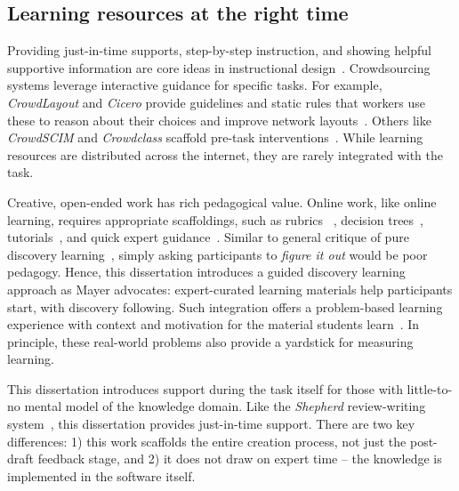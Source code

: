  

\subsection{Learning resources at the right time}
Providing just-in-time supports, step-by-step instruction, and showing helpful supportive
 information are core ideas in instructional design~\cite{Kirschner2008}. Crowdsourcing 
systems leverage interactive guidance for specific tasks. For example, \textit{CrowdLayout} and 
\textit{Cicero} provide guidelines and static rules that workers use these to reason about their choices
 and improve network layouts~\cite{chen2019cicero, Singh:2018:CCD:3173574.3173806}. 
Others like \textit{CrowdSCIM} and \textit{Crowdclass} scaffold pre-task interventions~\cite{Lee2016,wang2018exploring}. 
While learning resources are distributed across the internet, they are rarely integrated with the task. 

Creative, open-ended work has rich pedagogical value. Online work, like 
online learning, requires appropriate scaffoldings, such as rubrics
~\cite{Boud1995, Kulkarni2013peer}, decision trees~\cite{Lee2016,Yu2006}, 
tutorials~\cite{Andersen2012}, and quick expert guidance~\cite{dow2012shepherding}. 
Similar to general critique of pure discovery learning~\cite{Mayer2004}, simply 
asking participants to \textit{figure it out} would be poor pedagogy. Hence, this dissertation
introduces a guided discovery learning approach as Mayer advocates: expert-curated 
learning materials help participants start, with discovery following. Such integration 
offers a problem-based learning experience with context and 
motivation for the material students learn~\cite{Savery1995}. In principle, these 
real-world problems also provide a yardstick for measuring learning. 

This dissertation introduces support during the task itself for those with little-to-no mental model of the knowledge domain. 
Like the \textit{Shepherd} review-writing system~\cite{dow2012shepherding}, this dissertation provides just-in-time support. 
There are two key differences: 1) this work scaffolds the entire creation process, not just the post-draft feedback
 stage, and 2) it does not draw on expert time – the knowledge is implemented in the software itself. 


